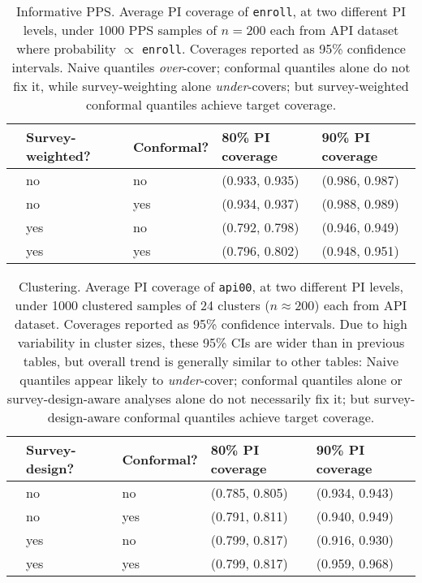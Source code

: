 \documentclass[10.5pt, letterpaper]{article}
\numberwithin{table}{section}
\numberwithin{figure}{section}
\numberwithin{equation}{section}
\begin{document}
\begin{table}[ht!]
\centering
\begin{tabular}{rllll}
  \hline
 & Survey-weighted? & Conformal? & 80\% PI coverage & 90\% PI coverage \\
  \hline
  & no & no & (0.933, 0.935) & (0.986, 0.987) \\
  & no & yes & (0.934, 0.937) & (0.988, 0.989) \\
  & yes & no & (0.792, 0.798) & (0.946, 0.949) \\
  & yes & yes & (0.796, 0.802) & (0.948, 0.951) \\
   \hline
\end{tabular}
\caption{Informative PPS. Average PI coverage of \texttt{enroll}, at two different PI levels, under 1000 PPS samples of $n=200$ each from API dataset where probability $\propto$ \texttt{enroll}. Coverages reported as 95\% confidence intervals. Naive quantiles \emph{over}-cover; conformal quantiles alone do not fix it, while survey-weighting alone \emph{under}-covers; but survey-weighted conformal quantiles achieve target coverage.}
\label{table:PPS-enroll}
\end{table}


\begin{table}[ht!]
\centering
\begin{tabular}{rllll}
  \hline
 & Survey-design? & Conformal? & 80\% PI coverage & 90\% PI coverage \\
  \hline
  & no & no & (0.785, 0.805) & (0.934, 0.943) \\
  & no & yes & (0.791, 0.811) & (0.940, 0.949) \\
  & yes & no & (0.799, 0.817) & (0.916, 0.930) \\
  & yes & yes & (0.799, 0.817) & (0.959, 0.968) \\
   \hline
\end{tabular}
\caption{Clustering. Average PI coverage of \texttt{api00}, at two different PI levels, under 1000 clustered samples of 24 clusters ($n\approx 200$) each from API dataset. Coverages reported as 95\% confidence intervals. Due to high variability in cluster sizes, these 95\% CIs are wider than in previous tables, but overall trend is generally similar to other tables: Naive quantiles appear likely to \emph{under}-cover; conformal quantiles alone or survey-design-aware analyses alone do not necessarily fix it; but survey-design-aware conformal quantiles achieve target coverage.}
\label{table:clus}
\end{table}
\end{document}
